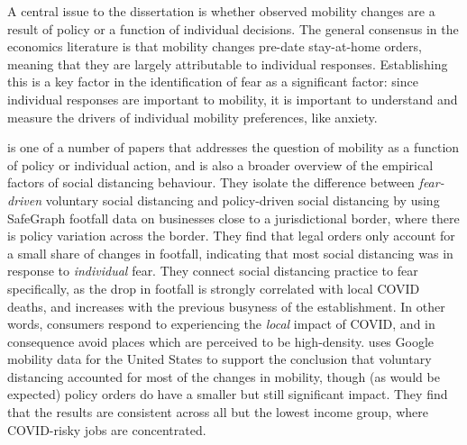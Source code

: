 \documentclass{article}
\begin{document}
A central issue to the dissertation is whether observed mobility changes are a result of policy or a function of individual decisions. The general consensus in the economics literature is that mobility changes pre-date stay-at-home orders, meaning that they are largely attributable to individual responses. Establishing this is a key factor in the identification of fear as a significant factor: since individual responses are important to mobility, it is important to understand and measure the drivers of individual mobility preferences, like anxiety.

\textcite{goolsbeeFearLockdownDiversion2021} is one of a number of papers that addresses the question of mobility as a function of policy or individual action, and is also a broader overview of the empirical factors of social distancing behaviour. They isolate the difference between \textit{fear-driven} voluntary social distancing and policy-driven social distancing by using SafeGraph footfall data on businesses close to a jurisdictional border, where there is policy variation across the border. They find that legal orders only account for a small share of changes in footfall, indicating that most social distancing was in response to \textit{individual} fear. They connect social distancing practice to fear specifically, as the drop in footfall is strongly correlated with local COVID deaths, and increases with the previous busyness of the establishment. In other words, consumers respond to experiencing the \textit{local} impact of COVID, and in consequence avoid places which are perceived to be high-density. \textcite{maloneyDeterminantsSocialDistancing2020} uses Google mobility data for the United States to support the conclusion that voluntary distancing accounted for most of the changes in mobility, though (as would be expected) policy orders do have a smaller but still significant impact. They find that the results are consistent across all but the lowest income group, where COVID-risky jobs are concentrated. 
\end{document}
